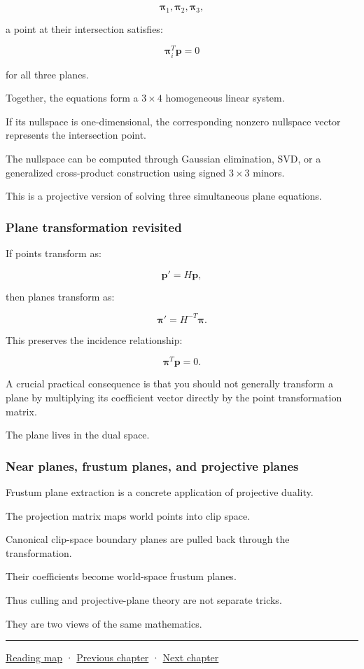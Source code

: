 \[
 \boldsymbol\pi_1,\boldsymbol\pi_2,\boldsymbol\pi_3,
\]

a point at their intersection satisfies:

\[
 \boldsymbol\pi_i^T\mathbf p=0
\]

for all three planes.

Together, the equations form a \(3\times4\) homogeneous linear system.

If its nullspace is one-dimensional, the corresponding nonzero nullspace vector represents the intersection point.

The nullspace can be computed through Gaussian elimination, SVD, or a generalized cross-product construction using signed \(3\times3\) minors.

This is a projective version of solving three simultaneous plane equations.

\subsubsection{Plane transformation revisited}\label{plane-transformation-revisited}

If points transform as:

\[
 \mathbf p'=H\mathbf p,
\]

then planes transform as:

\[
 \boxed{ \boldsymbol\pi'=H^{-T}\boldsymbol\pi }.
\]

This preserves the incidence relationship:

\[
 \boldsymbol\pi^T\mathbf p=0.
\]

A crucial practical consequence is that you should not generally transform a plane by multiplying its coefficient vector directly by the point transformation matrix.

The plane lives in the dual space.

\subsubsection{Near planes, frustum planes, and projective planes}\label{near-planes-frustum-planes-and-projective-planes}

Frustum plane extraction is a concrete application of projective duality.

The projection matrix maps world points into clip space.

Canonical clip-space boundary planes are pulled back through the transformation.

Their coefficients become world-space frustum planes.

Thus culling and projective-plane theory are not separate tricks.

They are two views of the same mathematics.

\begin{center}\rule{0.5\linewidth}{0.5pt}\end{center}

\href{Chapter\%20Edition/01\%20-\%20Computing\%20Foundations/00\%20-\%20Reading\%20Map}{Reading map} · \hyperref[02-foundations-ii-ch031]{Previous chapter} · \hyperref[02-foundations-ii-ch033]{Next chapter}
